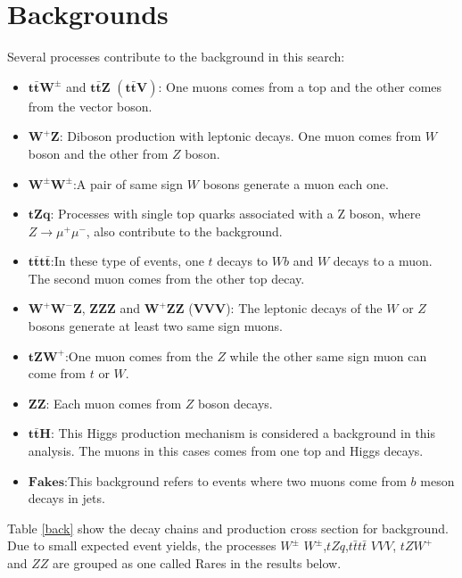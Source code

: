 \section{Backgrounds}
Several processes contribute to the background in this search:
\begin{itemize}
		\item $\bm{t\bar{t}W^{\pm}}$ and $\bm{t\bar{t}Z}$ $\bm{(t\bar{t}V)}$: One muons comes from a top and the other comes from the vector boson.
			\item $\bm{W^{+}Z}$: Diboson production with leptonic decays. One muon comes from $W$ boson and the other from $Z$ boson.
		\item $\bm{W^{\pm}W^{\pm}}$:A pair of same sign $W$ bosons generate a muon each one.
		\item $\bm{tZq}$: Processes with single top quarks associated with a Z boson, where $Z\rightarrow \mu^+ \mu^-$, also contribute to the background.
	\item $\bm{t\bar{t}t\bar{t}}$:In these type of events, one $t$ decays to $Wb$ and $W$ decays to a muon. The second muon comes from the other top decay.
		\item$\bm{W^{+}W^{-}Z}$, $\bm{ZZZ}$ and $\bm{W^{+}ZZ}$ ($\bm{VVV}$): The leptonic decays of the $W$ or $Z$ bosons generate at least two same sign muons.
	\item $\bm{tZW^{+}}$:One muon comes from the $Z$ while the other same sign muon can come from $t$ or $W$. 
	\item $\bm{ZZ}$: Each muon comes from $Z$ boson decays.
			\item $\bm{t\bar{t}H}$: This Higgs production mechanism is considered a background in this analysis. The muons in this cases comes from one top and Higgs decays. 
	\item $\bm{Fakes}$:This background refers to events where two muons come from $b$ meson decays in jets.
\end{itemize}
Table \ref{back} show the decay chains and production cross section for background. Due to small expected event yields, the processes $W^\pm$ $W^\pm$,$tZq$,$t\bar{t}t\bar{t}$ $VVV$, $tZW^+$ and $ZZ$ are grouped as one called Rares in the results below.

\pagebreak 

